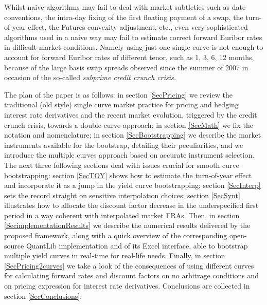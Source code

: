 \documentclass[11pt,reqno]{amsart}
\begin{document}
Whilst naive algorithms may fail to deal with market subtleties such as date conventions, the intra-day fixing of the first floating payment of a swap, the turn-of-year effect, the Futures convexity adjustment, etc., even very sophisticated algorithms used in a naive way may fail to estimate correct forward Euribor rates in difficult market conditions. Namely using just one single curve is not enough to account for forward Euribor rates of different tenor, such as 1, 3, 6, 12 months, because of the large basis swap spreads observed since the summer of 2007 in occasion of the so-called {\it subprime credit crunch crisis.}

The plan of the paper is as follows: 
in section \ref{SecPricing} we review the traditional (old style) single curve market practice for pricing and hedging interest rate derivatives and the recent market evolution, triggered by the credit crunch crisis, towards a double-curve approach;
in section \ref{SecMath} we fix the notation and nomenclature; 
in section \ref{SecBootstrapping} we describe the market instruments available for the bootstrap, detailing their peculiarities, and we introduce the multiple curves approach based on accurate instrument selection.
The next three following sections deal with issues crucial for smooth curve bootstrapping: 
section \ref{SecTOY} shows how to estimate the turn-of-year effect and incorporate it as a jump in the yield curve bootstrapping;
section \ref{SecInterp} sets the record straight on sensitive interpolation choices; 
section \ref{SecSynt} illustrates how to allocate the discount factor decrease in the underspecified first period in a way coherent with interpolated market FRAs.
Then, in section \ref{SecimplementationResults} we describe the numerical results delivered by the proposed framework, along with a quick overview of the corresponding open-source QuantLib implementation and of its Excel interface, able to bootstrap multiple yield curves in real-time for real-life needs.
Finally, in section \ref{SecPricing2curves} we take a look of the consequences of using different curves for calculating forward rates and discount factors on no arbitrage conditions and on pricing expression for interest rate derivatives.
Conclusions are collected in section \ref{SecConclusions}.
\end{document}
